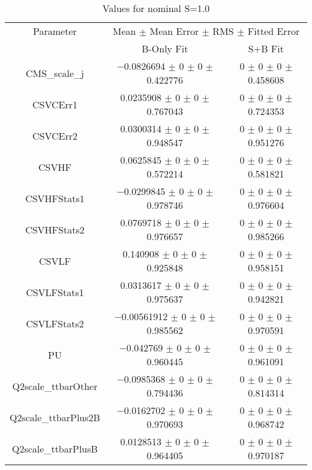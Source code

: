 \begin{table}
\centering
\caption{Values for nominal S=1.0}
\begin{tabular}{ccc}
\toprule
Parameter & \multicolumn{2}{c}{Mean $\pm$ Mean Error $\pm$ RMS $\pm$ Fitted Error}\\
 & B-Only Fit & S+B Fit\\
\midrule
CMS\_scale\_j & \num{-0.0826694} $\pm$ \num{0} $\pm$ \num{0} $\pm$ \num{0.422776} & \num{0} $\pm$ \num{0} $\pm$ \num{0} $\pm$ \num{0.458608}\\
CSVCErr1 & \num{0.0235908} $\pm$ \num{0} $\pm$ \num{0} $\pm$ \num{0.767043} & \num{0} $\pm$ \num{0} $\pm$ \num{0} $\pm$ \num{0.724353}\\
CSVCErr2 & \num{0.0300314} $\pm$ \num{0} $\pm$ \num{0} $\pm$ \num{0.948547} & \num{0} $\pm$ \num{0} $\pm$ \num{0} $\pm$ \num{0.951276}\\
CSVHF & \num{0.0625845} $\pm$ \num{0} $\pm$ \num{0} $\pm$ \num{0.572214} & \num{0} $\pm$ \num{0} $\pm$ \num{0} $\pm$ \num{0.581821}\\
CSVHFStats1 & \num{-0.0299845} $\pm$ \num{0} $\pm$ \num{0} $\pm$ \num{0.978746} & \num{0} $\pm$ \num{0} $\pm$ \num{0} $\pm$ \num{0.976604}\\
CSVHFStats2 & \num{0.0769718} $\pm$ \num{0} $\pm$ \num{0} $\pm$ \num{0.976657} & \num{0} $\pm$ \num{0} $\pm$ \num{0} $\pm$ \num{0.985266}\\
CSVLF & \num{0.140908} $\pm$ \num{0} $\pm$ \num{0} $\pm$ \num{0.925848} & \num{0} $\pm$ \num{0} $\pm$ \num{0} $\pm$ \num{0.958151}\\
CSVLFStats1 & \num{0.0313617} $\pm$ \num{0} $\pm$ \num{0} $\pm$ \num{0.975637} & \num{0} $\pm$ \num{0} $\pm$ \num{0} $\pm$ \num{0.942821}\\
CSVLFStats2 & \num{-0.00561912} $\pm$ \num{0} $\pm$ \num{0} $\pm$ \num{0.985562} & \num{0} $\pm$ \num{0} $\pm$ \num{0} $\pm$ \num{0.970591}\\
PU & \num{-0.042769} $\pm$ \num{0} $\pm$ \num{0} $\pm$ \num{0.960445} & \num{0} $\pm$ \num{0} $\pm$ \num{0} $\pm$ \num{0.961091}\\
Q2scale\_ttbarOther & \num{-0.0985368} $\pm$ \num{0} $\pm$ \num{0} $\pm$ \num{0.794436} & \num{0} $\pm$ \num{0} $\pm$ \num{0} $\pm$ \num{0.814314}\\
Q2scale\_ttbarPlus2B & \num{-0.0162702} $\pm$ \num{0} $\pm$ \num{0} $\pm$ \num{0.970693} & \num{0} $\pm$ \num{0} $\pm$ \num{0} $\pm$ \num{0.968742}\\
Q2scale\_ttbarPlusB & \num{0.0128513} $\pm$ \num{0} $\pm$ \num{0} $\pm$ \num{0.964405} & \num{0} $\pm$ \num{0} $\pm$ \num{0} $\pm$ \num{0.970187}\\

\end{tabular}
\end{table}
